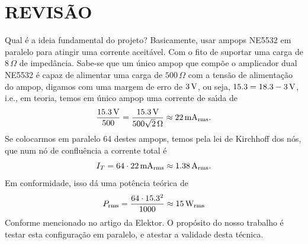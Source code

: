 


\section{REVIS\~AO}


Qual \'e a ideia fundamental do projeto? Basicamente, usar ampops NE5532 em paralelo para atingir uma corrente aceit\'avel. Com o fito de suportar uma carga de $8\,\Omega$ de imped\^ancia. Sabe-se que um \'unico ampop que comp\~oe o amplicador dual NE5532 \'e capaz de alimentar uma carga de $500\,\Omega$ com a tens\~ao de alimenta\c c\~ao do ampop, digamos com uma margem de erro de $3\,\hbox{V}$, ou seja, $15.3=18.3-3\,\hbox{V}$, i.e., em teoria, temos em \'unico ampop uma corrente de sa\'\i da de 
$$
  {15.3\,\hbox{V}\over 500}={15.3\,\hbox{V}\over 500\sqrt2\,\Omega}\approx22\,\hbox{mA}_{\rm rms}.
$$
Se colocarmos em paralelo 64 destes ampops, temos pela lei de Kirchhoff dos n\'os, que num n\'o de conflu\^encia a corrente total \'e
$$
  I_T=64\cdot22\,\hbox{mA}_{\rm rms}\approx1.38\,\hbox{A}_{\rm rms}.
$$
Em conformidade, isso d\'a uma pot\^encia te\'orica de 
$$
  P_{\rm rms}={64\cdot15.3^2\over1000}\approx15\,\hbox{W}_{\rm rms}
$$
Conforme mencionado no artigo da Elektor. O prop\'osito do nosso trabalho \'e testar esta configura\c c\~ao em paralelo, e atestar a validade desta t\'ecnica.





\bye
